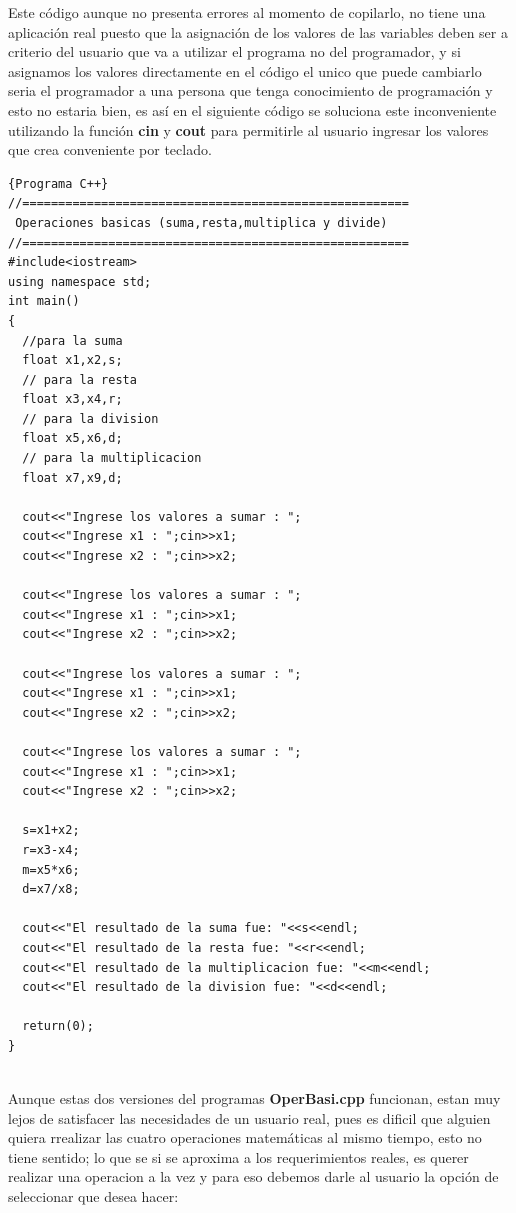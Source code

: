\documentclass[a4paper,12pt,spanish]{article}
\begin{document}
    Este código aunque no presenta errores al momento de copilarlo, no tiene una aplicación real puesto que la asignación de los valores de las variables deben ser a criterio del usuario que va a utilizar el programa no del programador, y si asignamos los valores directamente en el código el unico que puede cambiarlo seria el programador a una persona que tenga conocimiento de programación y esto no estaria bien, es así en el siguiente código se soluciona este inconveniente utilizando la función \textbf{cin} y  \textbf{cout} para permitirle al usuario ingresar los valores que crea conveniente por teclado. 
\newpage
\begin{lstlisting}[frame=trBL,firstnumber=1,caption={\textbf{operbasi2.cpp}: Operaciones Básicas}]{Programa C++}
//======================================================
 Operaciones basicas (suma,resta,multiplica y divide)
//======================================================
#include<iostream>
using namespace std;
int main()
{
  //para la suma
  float x1,x2,s;
  // para la resta
  float x3,x4,r;
  // para la division
  float x5,x6,d;  
  // para la multiplicacion
  float x7,x9,d;
  
  cout<<"Ingrese los valores a sumar : ";
  cout<<"Ingrese x1 : ";cin>>x1;
  cout<<"Ingrese x2 : ";cin>>x2;

  cout<<"Ingrese los valores a sumar : ";
  cout<<"Ingrese x1 : ";cin>>x1;
  cout<<"Ingrese x2 : ";cin>>x2;

  cout<<"Ingrese los valores a sumar : ";
  cout<<"Ingrese x1 : ";cin>>x1;
  cout<<"Ingrese x2 : ";cin>>x2;

  cout<<"Ingrese los valores a sumar : ";
  cout<<"Ingrese x1 : ";cin>>x1;
  cout<<"Ingrese x2 : ";cin>>x2;

  s=x1+x2;
  r=x3-x4;
  m=x5*x6;
  d=x7/x8;

  cout<<"El resultado de la suma fue: "<<s<<endl;
  cout<<"El resultado de la resta fue: "<<r<<endl;
  cout<<"El resultado de la multiplicacion fue: "<<m<<endl;
  cout<<"El resultado de la division fue: "<<d<<endl;

  return(0);
}
  
\end{lstlisting}

    



    Aunque estas dos versiones del programas \textbf{OperBasi.cpp} funcionan,  estan muy lejos de satisfacer las necesidades de un usuario real, pues es dificil que alguien quiera rrealizar las cuatro operaciones matemáticas al mismo tiempo, esto no tiene sentido; lo que se si se aproxima a los requerimientos reales, es querer realizar una operacion a la vez y para eso debemos darle al usuario la opción de seleccionar que desea hacer:
\end{document}
